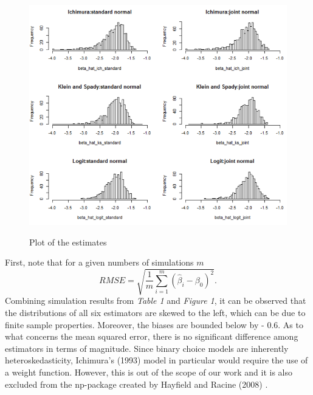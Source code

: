 \documentclass[a4paper]{article}
\begin{document}
\begin{figure}[H]
  \includegraphics[width=\linewidth]{plot_comparison.png}
  \label{fig:plot of the estimates}
   \caption{Plot of the estimates}
\end{figure}

First, note that for a given numbers of simulations $m$
\[RMSE = \sqrt{\frac{1}{m}\sum_{i=1}^m\left(\hat{\beta}_i - \beta_0\right)^2}.\]
Combining simulation results from \textit{Table 1} and \textit{Figure 1}, it can be observed that the distributions of all six estimators are skewed to the left, which can be due to finite sample properties. Moreover, the biases are bounded below by - 0.6. 
As to what concerns the mean squared error, there is no significant difference among estimators in terms of magnitude. Since binary choice models are inherently heteroskedasticity, Ichimura’s (1993) \cite{[6]} model in particular would require the use of a weight function. However, this is out of the scope of our work and it is also excluded from the np-package created by Hayfield and Racine (2008) \cite{[28]}.
\end{document}

